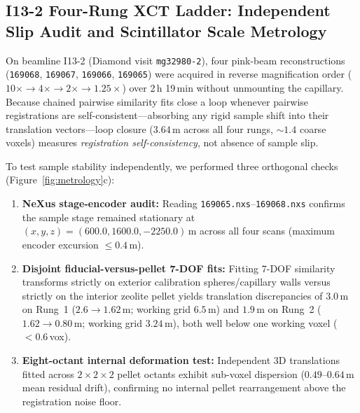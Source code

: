 \documentclass[10pt]{article}
\begin{document}
\subsection{I13-2 Four-Rung XCT Ladder: Independent Slip Audit and Scintillator Scale Metrology}
On beamline I13-2 (Diamond visit \texttt{mg32980-2}), four pink-beam reconstructions (\texttt{169068}, \texttt{169067}, \texttt{169066}, \texttt{169065}) were acquired in reverse magnification order ($10\times \to 4\times \to 2\times \to 1.25\times$) over 2\,h 19\,min without unmounting the capillary. Because chained pairwise similarity fits close a loop whenever pairwise registrations are self-consistent---absorbing any rigid sample shift into their translation vectors---loop closure ($3.64$\,\textmu m across all four rungs, $\sim 1.4$ coarse voxels) measures \emph{registration self-consistency}, not absence of sample slip.

To test sample stability independently, we performed three orthogonal checks (Figure~\ref{fig:metrology}c):
\begin{enumerate}
  \item \textbf{NeXus stage-encoder audit:} Reading \texttt{169065.nxs}--\texttt{169068.nxs} confirms the sample stage remained stationary at $(x, y, z) = (600.0, 1600.0, -2250.0)$\,\textmu m across all four scans (maximum encoder excursion $\le 0.4$\,\textmu m).
  \item \textbf{Disjoint fiducial-versus-pellet 7-DOF fits:} Fitting 7-DOF similarity transforms strictly on exterior calibration spheres/capillary walls versus strictly on the interior zeolite pellet yields translation discrepancies of $3.0$\,\textmu m on Rung~1 ($2.6 \to 1.62$\,\textmu m; working grid $6.5$\,\textmu m) and $1.9$\,\textmu m on Rung~2 ($1.62 \to 0.80$\,\textmu m; working grid $3.24$\,\textmu m), both well below one working voxel ($< 0.6$\,vox).
  \item \textbf{Eight-octant internal deformation test:} Independent 3D translations fitted across $2 \times 2 \times 2$ pellet octants exhibit sub-voxel dispersion ($0.49$--$0.64$\,\textmu m mean residual drift), confirming no internal pellet rearrangement above the registration noise floor.
\end{enumerate}
\end{document}
